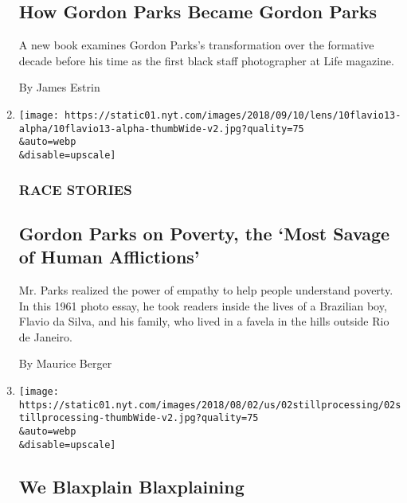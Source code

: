 \begin{enumerate}
  \hypertarget{how-gordon-parks-became-gordon-parks}{%
  \subsection{How Gordon Parks Became Gordon
  Parks}\label{how-gordon-parks-became-gordon-parks}}

  A new book examines Gordon Parks's transformation over the formative
  decade before his time as the first black staff photographer at Life
  magazine.

  By James Estrin
\item
  \href{/2018/09/10/lens/gordon-parks-on-poverty-the-most-savage-of-human-afflictions.html}{}

  \texttt{[image: https://static01.nyt.com/images/2018/09/10/lens/10flavio13-alpha/10flavio13-alpha-thumbWide-v2.jpg?quality=75\\\&auto=webp\\\&disable=upscale]}

  \hypertarget{race-stories-1}{%
  \subsubsection{RACE STORIES}\label{race-stories-1}}

  \hypertarget{gordon-parks-on-poverty-the-most-savage-of-human-afflictions}{%
  \subsection{Gordon Parks on Poverty, the `Most Savage of Human
  Afflictions'}\label{gordon-parks-on-poverty-the-most-savage-of-human-afflictions}}

  Mr. Parks realized the power of empathy to help people understand
  poverty. In this 1961 photo essay, he took readers inside the lives of
  a Brazilian boy, Flavio da Silva, and his family, who lived in a
  favela in the hills outside Rio de Janeiro.

  By Maurice Berger
\item
  \href{/2018/08/02/podcasts/still-processing-blaxplaining-blaxploitation-sorry-to-bother-you.html}{}

  \texttt{[image: https://static01.nyt.com/images/2018/08/02/us/02stillprocessing/02stillprocessing-thumbWide-v2.jpg?quality=75\\\&auto=webp\\\&disable=upscale]}

  \hypertarget{we-blaxplain-blaxplaining}{%
  \subsection{We Blaxplain
  Blaxplaining}\label{we-blaxplain-blaxplaining}}


\end{enumerate}
